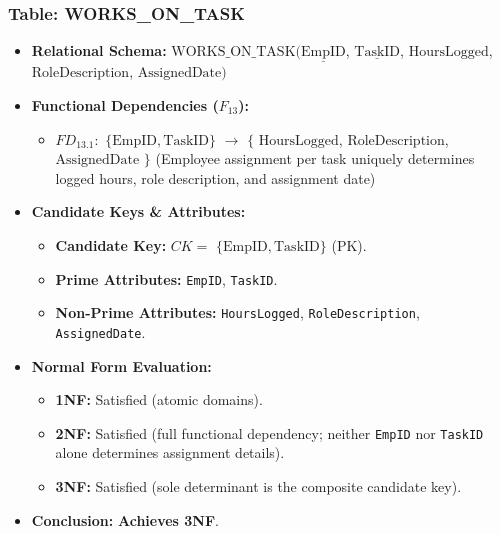 \documentclass[a4paper,12pt]{report}
\providecommand{\tightlist}{%
  \setlength{\itemsep}{0pt}\setlength{\parskip}{0pt}}
\begin{document}
\subsubsection{\texorpdfstring{Table: WORKS\_\allowbreak{}ON\_\allowbreak{}TASK}{Table: WORKSONTASK}}\label{table-works_on_task}

\begin{itemize}
\item
  \textbf{Relational Schema:} \(\text{WORKS\_ON\_TASK}(\underline{\text{EmpID}}\), \(\underline{\text{TaskID}}\), \(\text{HoursLogged}\), \(\text{RoleDescription}\), \(\text{AssignedDate})\)
\item
  \textbf{Functional Dependencies (\(F_{13}\)):}

  \begin{itemize}
  \tightlist
  \item
    \(FD_{13.1}:\) \(\{\text{EmpID}, \text{TaskID}\}\) \(\rightarrow\) \(\{\) \(\text{HoursLogged}\), \(\text{RoleDescription}\), \(\text{AssignedDate}\) \(\}\) (Employee assignment per task uniquely determines logged hours, role description, and assignment date)
  \end{itemize}
\item
  \textbf{Candidate Keys \& Attributes:}

  \begin{itemize}
  \item
    \textbf{Candidate Key:} \(CK =\) \(\{\text{EmpID}, \text{TaskID}\}\) (PK).
  \item
    \textbf{Prime Attributes:} \texttt{EmpID}, \texttt{TaskID}.
  \item
    \textbf{Non-Prime Attributes:} \texttt{HoursLogged}, \texttt{RoleDescription}, \texttt{AssignedDate}.
  \end{itemize}
\item
  \textbf{Normal Form Evaluation:}

  \begin{itemize}
  \item
    \textbf{1NF:} Satisfied (atomic domains).
  \item
    \textbf{2NF:} Satisfied (full functional dependency; neither \texttt{EmpID} nor \texttt{TaskID} alone determines assignment details).
  \item
    \textbf{3NF:} Satisfied (sole determinant is the composite candidate key).
  \end{itemize}
\item
  \textbf{Conclusion:} \textbf{Achieves 3NF}.
\end{itemize}
\end{document}
